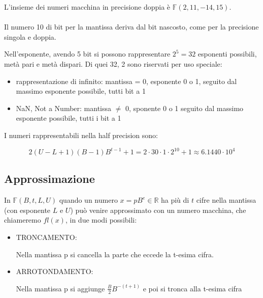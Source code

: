 \documentclass[a4paper, 11pt]{article}
\begin{document}
            L'insieme dei numeri macchina in precisione doppia è $\mathbb{F}(2, 11, -14, 15)$.

            \paragraph{}
            Il numero 10 di bit per la mantissa deriva dal bit nascosto, come per la precisione singola e doppia.

            Nell'esponente, avendo 5 bit si possono rappresentare $2^5 = 32$ esponenti possibili, metà pari e metà dispari.
            Di quei 32, 2 sono riservati per uso speciale:

            \begin{itemize}
                \item rappresentazione di infinito: mantissa = 0, esponente 0 o 1, seguito dal massimo esponente possibile, tutti bit a 1
                \item NaN, Not a Number: mantissa $\neq$ 0, sponente 0 o 1 seguito dal massimo esponente possibile, tutti i bit a 1
            \end{itemize}

            I numeri rappresentabili nella half precision sono:



            \[
                2(U-L+1)(B-1)B^{t-1}+1 = 2\cdot 30\cdot1\cdot2^{10}+1 \approx 6.1440\cdot 10^{4}
            \]


            
        \subsection{Approssimazione}

        In $\mathbb{F}(B,t,L,U)$ quando un numero $x= pB^e \in \mathbb{R}$ ha più di $t$ cifre nella mantissa
        (con esponente $L$ e $U$) può venire approssimato con un numero macchina, che chiameremo $fl(x)$, in due modi possibili:

        \begin{itemize}
            \item TRONCAMENTO: 
            
            Nella mantissa p si cancella la parte che eccede la t-esima cifra.


            \item ARROTONDAMENTO:
            
            Nella mantissa p si aggiunge $\frac{B}{2}B^{-(t+1)}$ e poi si tronca alla t-esima cifra

        \end{itemize}
\end{document}
